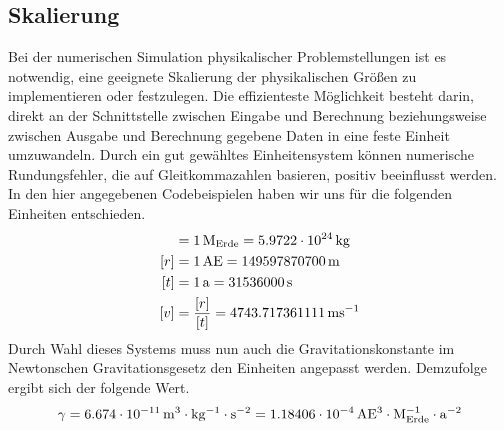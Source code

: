 

  \subsection{Skalierung} %
  \label{sub:skalierung}

    Bei der numerischen Simulation physikalischer Problemstellungen ist es notwendig, eine geeignete Skalierung der physikalischen Größen zu implementieren oder festzulegen.
    Die effizienteste Möglichkeit besteht darin, direkt an der Schnittstelle zwischen Eingabe und Berechnung beziehungsweise zwischen Ausgabe und Berechnung gegebene Daten in eine feste Einheit umzuwandeln.
    Durch ein gut gewähltes Einheitensystem können numerische Rundungsfehler, die auf Gleitkommazahlen basieren, positiv beeinflusst werden.
    In den hier angegebenen Codebeispielen haben wir uns für die folgenden Einheiten entschieden.
    \begin{align*}
      [m] &= 1\,\m{M_{\Earth}} = 5.9722\cdot10^{24}\,\m{kg} \\
      [r] &= 1\,\m{AE} = 149597870700\,\m{m} \\
      [t] &= 1\,\m{a} = 31536000\,\m{s} \\
      [v] &= \frac{[r]}{[t]} = 4743.717361111\,\m{ms}^{-1}
    \end{align*}
    Durch Wahl dieses Systems muss nun auch die Gravitationskonstante im Newtonschen Gravitationsgesetz den Einheiten angepasst werden.
    Demzufolge ergibt sich der folgende Wert.
    \[
      \gamma = 6.674\cdot 10^{-11} \,\mathrm{m^3\cdot kg^{-1}\cdot s^{-2}} =1.18406 \cdot 10^{-4} \,\mathrm{AE^3\cdot M_{Erde}^{-1}\cdot a^{-2}}
    \]


